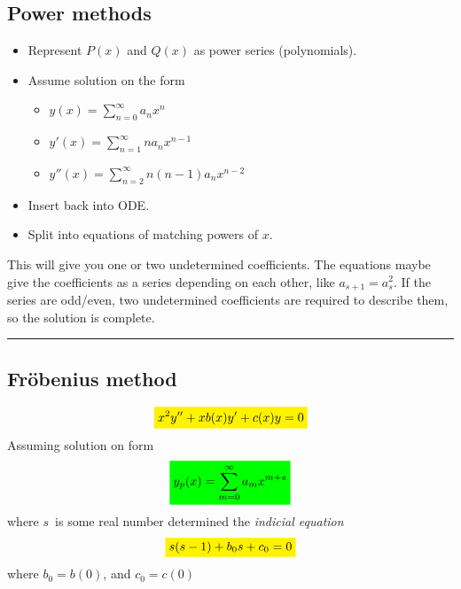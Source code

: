 \documentclass[10pt,a4paper]{article}
\newcommand{\holine}{\rule{286pt}{1pt}}
\newcommand{\yl}[1]{\colorbox{yellow}{$\displaystyle #1$}}
\newcommand{\gr}[1]{\colorbox{green}{$\displaystyle #1$}}
\begin{document}
\begin{multicols}{2}
\subsection*{Power methods}
\begin{itemize}
    \item Represent $P(x)$ and $Q(x)$ as power series (polynomials).
    \item Assume solution on the form
    \begin{itemize}
        \item $y(x) = \sum_{n=0}^\infty a_n x^n$
        \item $y'(x) = \sum_{n=1}^\infty n a_n x^{n-1}$
        \item $y''(x) = \sum_{n=2}^\infty n(n-1) a_n x^{n-2}$ 
    \end{itemize}
    \item Insert back into ODE.
    \item Split into equations of matching powers of $x$.
\end{itemize}
This will give you one or two undetermined coefficients. The equations maybe give the coefficients as a series depending on each other, like $a_{s+1} = a_s^2$. If the series are odd/even, two undetermined coefficients are required to describe them, so the solution is complete.



\holine
\subsection*{Fröbenius method}
\[\yl{
    x^2 y'' + xb(x)y' + c(x) y = 0
}\]
Assuming solution on form
\[\gr{
    y_p(x) = \sum_{m=0}^\infty a_m x^{m+s}
}\]
where $s$ is some real number determined  the \textit{indicial equation}
\[\yl{
    s(s-1) + b_0s + c_0 = 0
}\]
where $b_0=b(0)$, and $c_0=c(0)$


\end{multicols}
\end{document}
